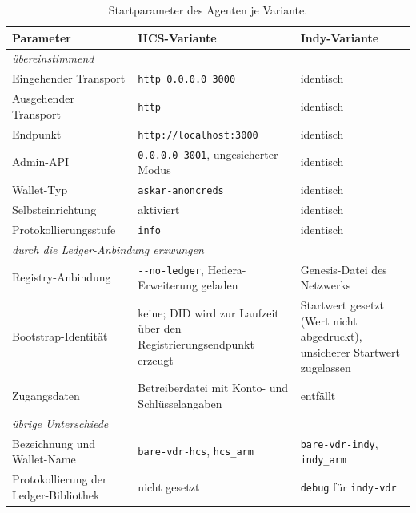 \begin{table}[htbp]
\renewcommand{\arraystretch}{1.3}
\footnotesize
  \centering
  \caption{Startparameter des Agenten je Variante.}
  \label{tab:impl-startparameter}
  \begin{tabular}{p{} p{} p{}}
    \toprule
    \textbf{Parameter} & \textbf{HCS-Variante} & \textbf{Indy-Variante} \\
    \midrule
    \multicolumn{3}{l}{\textit{übereinstimmend}} \\
    Eingehender Transport & \texttt{http 0.0.0.0 3000} & identisch \\
    Ausgehender Transport & \texttt{http} & identisch \\
    Endpunkt & \texttt{http://localhost:3000} & identisch \\
    Admin-API & \texttt{0.0.0.0 3001}, ungesicherter Modus & identisch \\
    Wallet-Typ & \texttt{askar-anoncreds} & identisch \\
    Selbsteinrichtung & aktiviert & identisch \\
    Protokollierungsstufe & \texttt{info} & identisch \\
    \midrule
    \multicolumn{3}{l}{\textit{durch die Ledger-Anbindung erzwungen}} \\
    Registry-Anbindung & \texttt{-{}-no-ledger}, Hedera-Erweiterung geladen & Genesis-Datei des Netzwerks \\
    Bootstrap-Identität & keine; DID wird zur Laufzeit über den Registrierungsendpunkt erzeugt & Startwert gesetzt (Wert nicht abgedruckt), unsicherer Startwert zugelassen \\
    Zugangsdaten & Betreiberdatei mit Konto- und Schlüsselangaben & entfällt \\
    \midrule
    \multicolumn{3}{l}{\textit{übrige Unterschiede}} \\
    Bezeichnung und Wallet-Name & \texttt{bare-vdr-hcs}, \texttt{hcs\_arm} & \texttt{bare-vdr-indy}, \texttt{indy\_arm} \\
    Protokollierung der Ledger-Bibliothek & nicht gesetzt & \texttt{debug} für \texttt{indy-vdr} \\
    \bottomrule
  \end{tabular}
\end{table}
\normalsize



